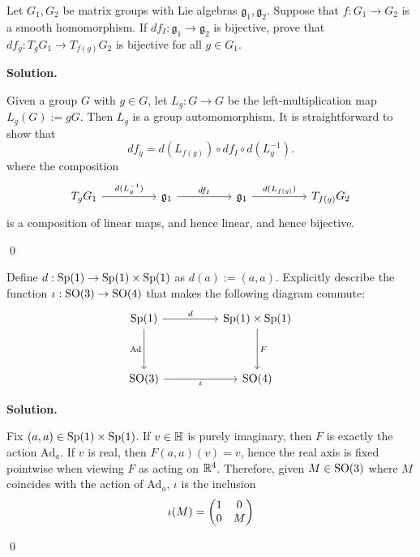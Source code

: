 \documentclass[12pt]{book}
\theoremstyle{definition}
\newenvironment{solution}
{%
  \par\noindent\textbf{Solution.}\quad
}
{%
  \qed\par
}
\begin{document}
\begin{taggedexercise}[\textcolor{red}{Complete}]
  Let $G_1, G_2$ be matrix groups with Lie algebras $\mathfrak{g}_1, \mathfrak{g_2}$.
  Suppose that $f: G_1 \to G_2$ is a smooth homomorphism.
  If $df_I : \mathfrak{g}_1 \to \mathfrak{g}_2$ is bijective, prove that $df_g : T_gG_1 \to T_{f(g)}G_2$ is bijective for all $g \in G_1$.
\end{taggedexercise}

\begin{solution}
  Given a group $G$ with $g \in G$, let $L_g : G \to G$ be the left-multiplication map $L_g(G) := gG$.
  Then $L_g$ is a group automomorphism.
  It is straightforward to show that
  \[df_g = d\left(L_{f(g)}\right) \circ df_I \circ d\left( L^{-1}_g \right).\]
  where the composition
  \[\begin{tikzcd}
	{T_gG_1} && {\mathfrak{g}_1} && {\mathfrak{g}_1} && {T_{f(g)}G_2}
	\arrow["{d(L^{-1}_g)}", from=1-1, to=1-3]
	\arrow["{df_I}", from=1-3, to=1-5]
	\arrow["{d(L_{f(g)})}", from=1-5, to=1-7]
\end{tikzcd}\]
  is a composition of linear maps, and hence linear, and hence bijective.

\end{solution}

\begin{taggedexercise}[\textcolor{yellow}{WIP}]
  Define $d: \mathrm{Sp}(1) \to \mathrm{Sp}(1) \times \mathrm{Sp}(1)$ as $d(a) := (a, a)$.
  Explicitly describe the function $\iota : \mathrm{SO}(3) \to \mathrm{SO}(4)$ that makes the following diagram commute:
  \[\begin{tikzcd}
	{\Sp{1}} && {\Sp{1} \times \Sp{1}} \\
	\\
	{\SO{3}} && {\SO{4}}
	\arrow["d", from=1-1, to=1-3]
	\arrow["{\text{Ad}}"', from=1-1, to=3-1]
	\arrow["F", from=1-3, to=3-3]
	\arrow["\iota"', from=3-1, to=3-3]
\end{tikzcd}\]
\end{taggedexercise}

\begin{solution}
  Fix $(a,a) \in \mathrm{Sp}(1) \times \mathrm{Sp}(1)$.
  If $v \in \mathbb{H}$ is purely imaginary, then $F$ is exactly the action $\text{Ad}_a$.
  If $v$ is real, then $F(a,a)(v) = v$, hence the real axis is fixed pointwise when viewing $F$ as acting on $\mathbb{R}^4$.
  Therefore, given $M \in \mathrm{SO}(3)$ where $M$ coincides with the action of $\text{Ad}_a$, $\iota$ is the inclusion 
  \[\iota(M) = \begin{pmatrix} 1 & 0 \\ 0 & M \end{pmatrix}\]



\end{solution}
\end{document}
